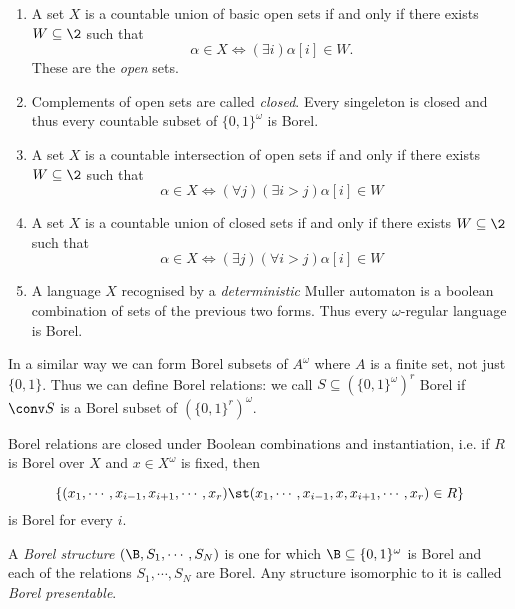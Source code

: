 \begin{example}
\begin{enumerate}
 \item A set $X$ is a  countable union of basic open sets if and only if there exists $W \subseteq \2$ such that
\[
 \alpha \in X \iff (\exists i) \alpha[i] \in W.
\]
These are the {\em open} sets. 

\item Complements of open sets are called {\em closed}.  Every singeleton is closed and thus
every countable subset of $\{0,1\}^\omega$ is Borel.

\item A set $X$ is a countable intersection of open sets if and only if there exists $W \subseteq \2$ such that
\[
\alpha \in X \iff (\forall j) (\exists i > j)\alpha[i] \in W
\]

\item A set $X$ is a countable union of closed sets if and only if there exists $W \subseteq \2$ such that
\[
\alpha \in X \iff (\exists j) (\forall i > j) \alpha[i] \in W
\]
 
\item A language $X$ recognised by a {\em deterministic} Muller automaton is a boolean combination of sets of the previous two forms. Thus 
every $\omega$-regular language is Borel.
\end{enumerate}
\end{example}

In a similar way we can form Borel subsets of $A^\omega$ where $A$ is a finite set, not just $\{0,1\}$.
Thus we can define Borel relations: we call $S \subseteq (\{0,1\}^\omega)^r$ Borel if $\conv S$ is a Borel subset of $(\{0,1\}^r)^\omega$.

\begin{lemma} \label{AS:lem:Borelclosure}
Borel relations are closed under Boolean combinations and instantiation, i.e. if $R$ is Borel over $X$ and $x \in X^\omega$ is fixed, then

\[
\{(x_1,\cdots,x_{i-1},x_{i+1},\cdots,x_r) \st (x_1,\cdots,x_{i-1},x,x_{i+1},\cdots,x_r) \in R\}
\]
 is Borel for every $i$.
\end{lemma}

\begin{definition} \label{AS:dfn:bap}
A {\em Borel structure} $(\B,S_1,\cdots,S_N)$ is one for which $\B \subseteq \{0,1\}^\omega$ is Borel 
and each of the relations $S_1,\cdots, S_N$ are Borel. Any structure isomorphic to it is called {\em Borel presentable}.
\end{definition}

